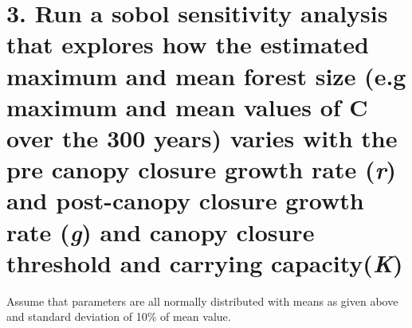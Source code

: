 \documentclass[
]{article}
\begin{document}
\hypertarget{run-a-sobol-sensitivity-analysis-that-explores-how-the-estimated-maximum-and-mean-forest-size-e.g-maximum-and-mean-values-of-c-over-the-300-years-varies-with-the-pre-canopy-closure-growth-rate-r-and-post-canopy-closure-growth-rate-g-and-canopy-closure-threshold-and-carrying-capacityk}{%
\section{\texorpdfstring{3. Run a sobol sensitivity analysis that
explores how the estimated maximum and mean forest size (e.g maximum and
mean values of C over the 300 years) varies with the pre canopy closure
growth rate (\emph{r}) and post-canopy closure growth rate (\emph{g})
and canopy closure threshold and carrying
capacity(\emph{K})}{3. Run a sobol sensitivity analysis that explores how the estimated maximum and mean forest size (e.g maximum and mean values of C over the 300 years) varies with the pre canopy closure growth rate (r) and post-canopy closure growth rate (g) and canopy closure threshold and carrying capacity(K)}}\label{run-a-sobol-sensitivity-analysis-that-explores-how-the-estimated-maximum-and-mean-forest-size-e.g-maximum-and-mean-values-of-c-over-the-300-years-varies-with-the-pre-canopy-closure-growth-rate-r-and-post-canopy-closure-growth-rate-g-and-canopy-closure-threshold-and-carrying-capacityk}}

Assume that parameters are all normally distributed with means as given
above and standard deviation of 10\% of mean value.
\end{document}
